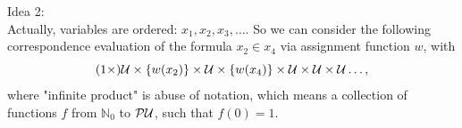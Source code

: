 Idea 2:\\

Actually, variables are ordered: $x_1,x_2,x_3,\dots$.
So we can consider the following correspondence evaluation of the formula $x_2\in x_4$ via assignment function $w$, with 
\[
(1\times)\mathcal{U}\times \{w(x_2)\}\times\mathcal{U}\times\{w(x_4)\}\times\mathcal{U}\times\mathcal{U}\times\mathcal{U}\dots,
\]
where "infinite product" is abuse of notation, which means a collection of functions $f$ from $\mathbb{N}_0$ to $\mathcal{P}\mathcal{U}$, such that $f(0)=1$. %

